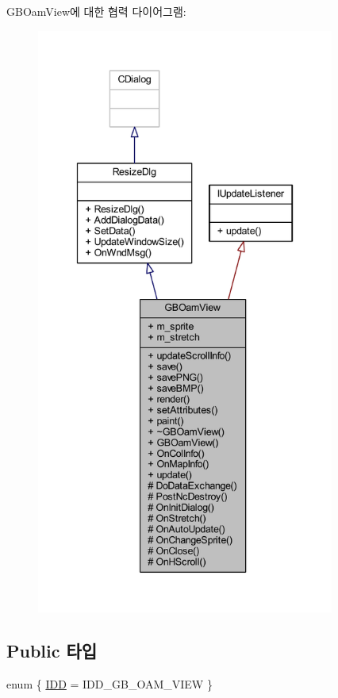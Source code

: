 G\+B\+Oam\+View에 대한 협력 다이어그램\+:\nopagebreak
\begin{figure}[H]
\begin{center}
\leavevmode
\includegraphics[height=550pt]{class_g_b_oam_view__coll__graph}
\end{center}
\end{figure}
\subsection*{Public 타입}
\begin{DoxyCompactItemize}
\item 
enum \{ \mbox{\hyperlink{class_g_b_oam_view_a5c41d4094ee7a3c5fc13c3e57414e350ae84ca5a6130d1f054bb8372fc76c89c9}{I\+DD}} = I\+D\+D\+\_\+\+G\+B\+\_\+\+O\+A\+M\+\_\+\+V\+I\+EW
 \}
\end{DoxyCompactItemize}
